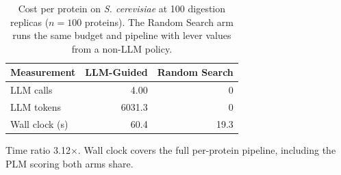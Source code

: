 \begin{table}[!tb]
  \centering
  \caption{Cost per protein on \textnormal{\textnormal{\textit{S. cerevisiae}}} at 100 digestion replicas ($n=100$ proteins). The Random Search arm runs the same budget and pipeline with lever values from a non-LLM policy.}
  \label{tab:cost_yeast_r100}
  \begin{tabular}{lrr}
    \toprule
    Measurement & LLM-Guided & Random Search \\
    \midrule
    LLM calls & 4.00 & 0 \\
    LLM tokens & 6031.3 & 0 \\
    Wall clock (s) & 60.4 & 19.3 \\
    \bottomrule
  \end{tabular}
  \par\smallskip\footnotesize{Time ratio 3.12$\times$. Wall clock covers the full per-protein pipeline, including the PLM scoring both arms share.}
\end{table}
